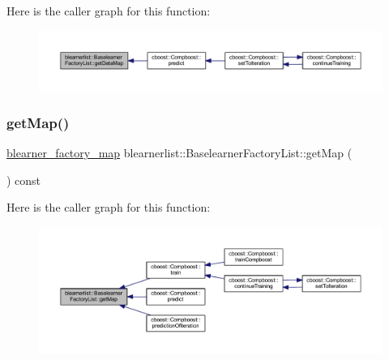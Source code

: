 Here is the caller graph for this function\+:\nopagebreak
\begin{figure}[H]
\begin{center}
\leavevmode
\includegraphics[width=350pt]{classblearnerlist_1_1_baselearner_factory_list_aeb83b67769e5fb34e7acc14c7e651dfc_icgraph}
\end{center}
\end{figure}
\mbox{\label{classblearnerlist_1_1_baselearner_factory_list_aeb573190a689af611e2f80ca8ed65d95}} 
\subsubsection{\texorpdfstring{get\+Map()}{getMap()}}
{\footnotesize\ttfamily \mbox{\hyperlink{baselearner__factory__list_8h_a058570e00ae11b882cfed36eb40be025}{blearner\+\_\+factory\+\_\+map}} blearnerlist\+::\+Baselearner\+Factory\+List\+::get\+Map (\begin{DoxyParamCaption}{ }\end{DoxyParamCaption}) const}

Here is the caller graph for this function\+:\nopagebreak
\begin{figure}[H]
\begin{center}
\leavevmode
\includegraphics[width=350pt]{classblearnerlist_1_1_baselearner_factory_list_aeb573190a689af611e2f80ca8ed65d95_icgraph}
\end{center}
\end{figure}
\mbox{\label{classblearnerlist_1_1_baselearner_factory_list_a1f0d601a978c0f50cf9b6228c1f92ce8}} 
